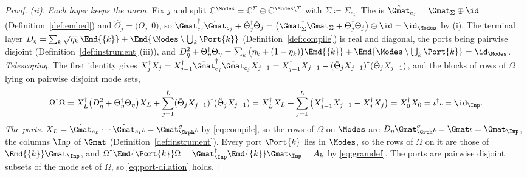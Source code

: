 \begin{proof}
\emph{(ii).} \emph{Each layer keeps the norm.} Fix $j$ and split
$\mathbb{C}^{\Modes}=\mathbb{C}^{\Sigma}\oplus\mathbb{C}^{\Modes\setminus\Sigma}$
with $\Sigma\coloneqq\Sigma_{e_j}$. The  is
$\hat\Gmat_{e_j}=\Gmat_\Sigma\oplus\id$ (Definition~\ref{def:embed}) and
$\hat\Theta_j=\big(\Theta_j\ \ 0\big)$, so
$\hat\Gmat_{e_j}^{\dagger}\hat\Gmat_{e_j}+\hat\Theta_j^{\dagger}\hat\Theta_j
=\big(\Gmat_\Sigma^{\dagger}\Gmat_\Sigma+\Theta_j^{\dagger}\Theta_j\big)\oplus\id
=\id_{\Modes}$ by (i). The terminal layer
$D_\eta=\sum_k\sqrt{\eta_k}\,\Emd{\{k\}}+\Emd{\Modes\setminus\bigcup_k\Port{k}}$
(Definition~\ref{def:compile}) is real and diagonal, the ports being pairwise
disjoint (Definition~\ref{def:instrument}\,(iii)), and
$D_\eta^{2}+\Theta_\eta^{\dagger}\Theta_\eta
=\sum_k\big(\eta_k+(1-\eta_k)\big)\Emd{\{k\}}+\Emd{\Modes\setminus\bigcup_k\Port{k}}
=\id_{\Modes}$.
\emph{Telescoping.} The first identity gives
$X_j^{\dagger}X_j=X_{j-1}^{\dagger}\hat\Gmat_{e_j}^{\dagger}\hat\Gmat_{e_j}X_{j-1}
=X_{j-1}^{\dagger}X_{j-1}-(\hat\Theta_jX_{j-1})^{\dagger}(\hat\Theta_jX_{j-1})$,
and the blocks of rows of $\Omega$ lying on pairwise disjoint mode sets,
\begin{equation*}
  \Omega^{\dagger}\Omega
  =X_L^{\dagger}\big(D_\eta^{2}+\Theta_\eta^{\dagger}\Theta_\eta\big)X_L
   +\sum_{j=1}^{L}(\hat\Theta_jX_{j-1})^{\dagger}(\hat\Theta_jX_{j-1})
  =X_L^{\dagger}X_L+\sum_{j=1}^{L}\big(X_{j-1}^{\dagger}X_{j-1}-X_j^{\dagger}X_j\big)
  =X_0^{\dagger}X_0=\iota^{\dagger}\iota=\id_{\Inp}.
\end{equation*}
\emph{The ports.} $X_L=\hat\Gmat_{e_L}\cdots\hat\Gmat_{e_1}\iota
=\Gmat^{\sigma}_{\Grph}\iota$ by \eqref{eq:compile}, so the rows of $\Omega$
on $\Modes$ are $D_\eta\Gmat^{\sigma}_{\Grph}\iota=\Gmat\iota=\Gmat_{\Inp}$,
the columns $\Inp$ of $\Gmat$ (Definition~\ref{def:instrument}). Every port
$\Port{k}$ lies in $\Modes$, so the rows of $\Omega$ on it are those of
$\Emd{\{k\}}\Gmat_{\Inp}$, and
$\Omega^{\dagger}\Emd{\Port{k}}\Omega=\Gmat_{\Inp}^{\dagger}\Emd{\{k\}}\Gmat_{\Inp}=A_k$
by \eqref{eq:gramdef}. The ports are pairwise disjoint subsets of the mode
set of $\Omega$, so \eqref{eq:port-dilation} holds.
\end{proof}
